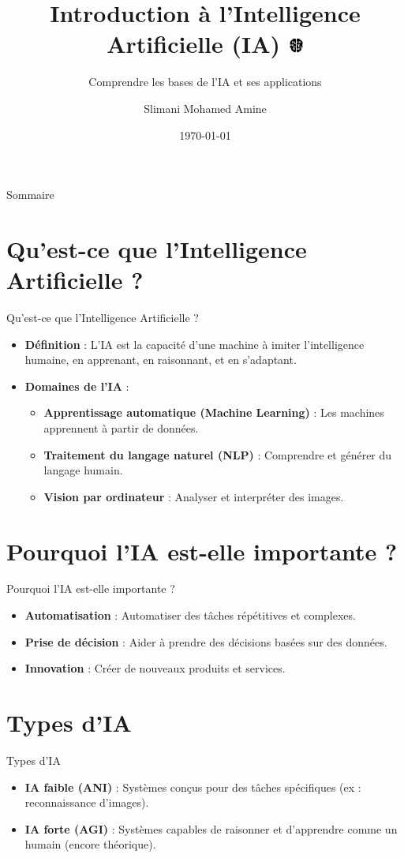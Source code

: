 \documentclass{clbeamer2024}
\title{
        Introduction à l'Intelligence Artificielle (IA)
	\includegraphics[width=0.5cm]{logos/IA2.png} \hfill
}
\subtitle{Comprendre les bases de l'IA et ses applications}
\author{Slimani Mohamed Amine}
\institute{EHTP}
\date{\today}
\begin{document}
	\setcounter{framenumber}{-1}
	\frame{\titlepage}
	
	
	
	\begin{frame}{Sommaire}
		\tableofcontents
	\end{frame}
	
	\section{Qu'est-ce que l'Intelligence Artificielle ?}
	\begin{frame}{Qu'est-ce que l'Intelligence Artificielle ?}
		\begin{itemize}
			\item \textbf{Définition} : L'IA est la capacité d'une machine à imiter l'intelligence humaine, en apprenant, en raisonnant, et en s'adaptant.
			\item \textbf{Domaines de l'IA} :
			\begin{itemize}
				\item \textbf{Apprentissage automatique (Machine Learning)} : Les machines apprennent à partir de données.
				\item \textbf{Traitement du langage naturel (NLP)} : Comprendre et générer du langage humain.
				\item \textbf{Vision par ordinateur} : Analyser et interpréter des images.
			\end{itemize}
		\end{itemize}
	\end{frame}
	
	
	\section{Pourquoi l'IA est-elle importante ?}
	\begin{frame}{Pourquoi l'IA est-elle importante ?}
		\begin{itemize}
			\item \textbf{Automatisation} : Automatiser des tâches répétitives et complexes.
			\item \textbf{Prise de décision} : Aider à prendre des décisions basées sur des données.
			\item \textbf{Innovation} : Créer de nouveaux produits et services.
		\end{itemize}
	\end{frame}
	
	
	\section{Types d'IA}
	\begin{frame}{Types d'IA}
		\begin{itemize}
			\item \textbf{IA faible (ANI)} : Systèmes conçus pour des tâches spécifiques (ex : reconnaissance d'images).
			\item \textbf{IA forte (AGI)} : Systèmes capables de raisonner et d'apprendre comme un humain (encore théorique).
		\end{itemize}
	\end{frame}
	
\end{document}
